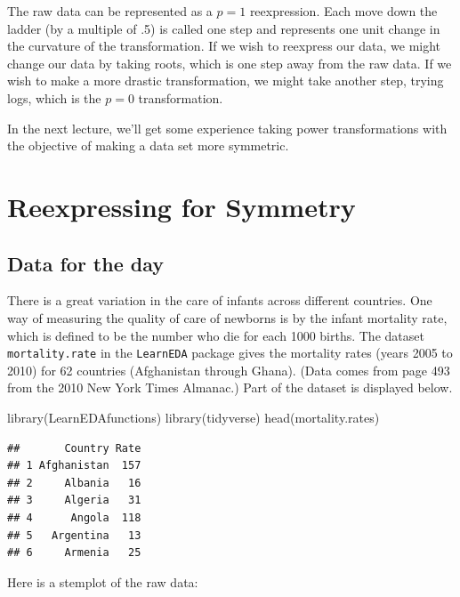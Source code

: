 \documentclass[
]{book}
\newenvironment{Shaded}{\begin{snugshade}}{\end{snugshade}}
\newcommand{\FunctionTok}[1]{\textcolor[rgb]{0.00,0.00,0.00}{#1}}
\newcommand{\NormalTok}[1]{#1}
\newcommand{\SpecialCharTok}[1]{\textcolor[rgb]{0.00,0.00,0.00}{#1}}
\begin{document}
The raw data can be represented as a \(p = 1\) reexpression. Each move down the ladder (by a multiple of .5) is called one step and represents one unit change in the curvature of the transformation. If we wish to reexpress our data, we might change our data by taking roots, which is one step away from the raw data. If we wish to make a more drastic transformation, we might take another step, trying logs, which is the \(p = 0\) transformation.

In the next lecture, we'll get some experience taking power transformations with the objective of making a data set more symmetric.

\hypertarget{reexpressing-for-symmetry}{%
\chapter{Reexpressing for Symmetry}\label{reexpressing-for-symmetry}}

\hypertarget{data-for-the-day}{%
\section{Data for the day}\label{data-for-the-day}}

There is a great variation in the care of infants across different countries. One way of measuring the quality of care of newborns is by the infant mortality rate, which is defined to be the number who die for each 1000 births. The dataset \texttt{mortality.rate} in the \texttt{LearnEDA} package gives the mortality rates (years 2005 to 2010) for 62 countries (Afghanistan through Ghana). (Data comes from page 493 from the 2010 New York Times Almanac.) Part of the dataset is displayed below.

\begin{Shaded}
\begin{Highlighting}[]
\FunctionTok{library}\NormalTok{(LearnEDAfunctions)}
\FunctionTok{library}\NormalTok{(tidyverse)}
\FunctionTok{head}\NormalTok{(mortality.rates)}
\end{Highlighting}
\end{Shaded}

\begin{verbatim}
##       Country Rate
## 1 Afghanistan  157
## 2     Albania   16
## 3     Algeria   31
## 4      Angola  118
## 5   Argentina   13
## 6     Armenia   25
\end{verbatim}

Here is a stemplot of the raw data:

\begin{Shaded}
\end{Shaded}
\end{document}
